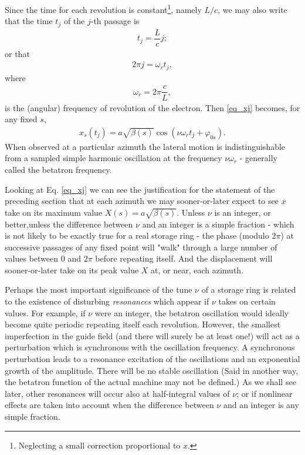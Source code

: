 Since the time for each revolution is constant\footnote{Neglecting a small correction proportional to $x$.}, namely $L/c$, we may also write that the time $t_j$ of the $j$-th passage is
\begin{align*}
	t_j = \dfrac{L}{c}j;
\end{align*}
or that
\begin{align}
	2\pi j = \omega_r t_j,
\end{align}
where
\begin{align}
	\omega_r = 2\pi \dfrac{c}{L},
\end{align}
is the (angular) frequency of revolution of the electron. Then \eqref{eq_xj} becomes, for any fixed $s$,
\begin{align}
	x_s(t_j) = a \sqrt{\beta(s)}\cos(\nu \omega_r t_j + \varphi_{0s}).
\end{align}
When observed at a particular azimuth the lateral motion is indistinguishable from a sampled simple harmonic oscillation  at the frequency $\nu \omega_r$ - generally called the betatron frequency.

Looking at Eq. \eqref{eq_xj} we can see the justification for the statement of the preceding section that at each azimuth we may sooner-or-later expect to see $x$ take on its maximum value $X(s)=a\sqrt{\beta(s)}$. Unless $\nu$ is an integer, or better,unless the difference between $\nu$ and an integer is a simple fraction - which is not likely to be exactly true for a real storage ring - the phase (modulo $2\pi$) at successive passages of any fixed point will "walk" through a large number of values between $0$ and $2\pi$ before repeating itself. And the displacement will sooner-or-later take on its peak value $X$ at, or near, each azimuth.

Perhaps the most important significance of the tune $\nu$ of a storage ring is related to the existence of disturbing \textit{resonances} which appear if $\nu$ takes on certain values. For example, if $\nu$ were an integer, the betatron oscillation would ideally become quite periodic repeating itself each revolution. However, the smallest imperfection in the guide field (and there will surely be at least one!) will act as a perturbation which is synchronous with the oscillation frequency. A synchronous perturbation leads to a resonance excitation of the oscillations and an exponential growth of the amplitude.  There will be no stable oscillation (Said in another way, the betatron function of the actual machine may not be defined.) As we shall see later, other resonances will occur also at half-integral values of $\nu$; or if nonlinear effects are taken into account when the difference between $\nu$ and an integer is any simple fraction.

